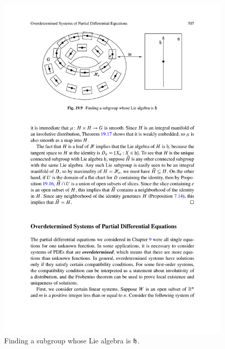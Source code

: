 \begin{figure}[htbp]
\centering
\includegraphics{pictures/Lie-sugroup}
\caption{Finding a subgroup whose Lie algebra is $\mathfrak{h}$.}
\end{figure}
